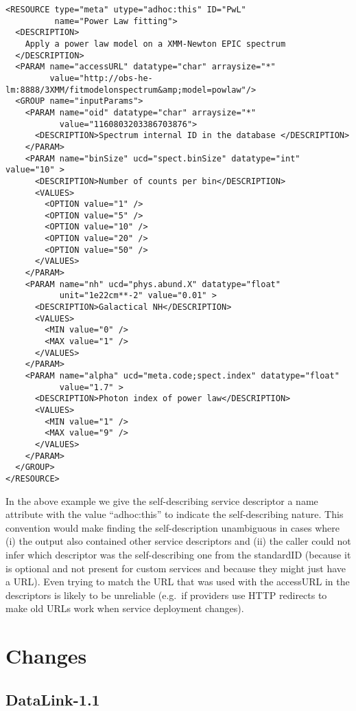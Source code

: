 \documentclass[11pt,a4paper]{ivoa}
\begin{document}
\begin{verbatim}
<RESOURCE type="meta" utype="adhoc:this" ID="PwL"
          name="Power Law fitting">
  <DESCRIPTION>
    Apply a power law model on a XMM-Newton EPIC spectrum
  </DESCRIPTION>
  <PARAM name="accessURL" datatype="char" arraysize="*"
         value="http://obs-he-lm:8888/3XMM/fitmodelonspectrum&amp;model=powlaw"/>
  <GROUP name="inputParams">
    <PARAM name="oid" datatype="char" arraysize="*"
           value="1160803203386703876">
      <DESCRIPTION>Spectrum internal ID in the database </DESCRIPTION>
    </PARAM>
    <PARAM name="binSize" ucd="spect.binSize" datatype="int" value="10" >
      <DESCRIPTION>Number of counts per bin</DESCRIPTION>
      <VALUES>
        <OPTION value="1" />
        <OPTION value="5" />
        <OPTION value="10" />
        <OPTION value="20" />
        <OPTION value="50" />
      </VALUES>
    </PARAM>
    <PARAM name="nh" ucd="phys.abund.X" datatype="float"
           unit="1e22cm**-2" value="0.01" >
      <DESCRIPTION>Galactical NH</DESCRIPTION>
      <VALUES>
        <MIN value="0" />
        <MAX value="1" />
      </VALUES>
    </PARAM>
    <PARAM name="alpha" ucd="meta.code;spect.index" datatype="float"
           value="1.7" >
      <DESCRIPTION>Photon index of power law</DESCRIPTION>
      <VALUES>
        <MIN value="1" />
        <MAX value="9" />
      </VALUES>
    </PARAM>
  </GROUP>
</RESOURCE>
\end{verbatim}

In the above example we give the self-describing service descriptor a
name attribute with the value ``adhoc:this'' to indicate the self-describing
nature. This convention would make finding the self-description
unambiguous in cases where (i) the output also contained other service
descriptors and (ii) the caller could not infer which descriptor was
the self-describing one from the standardID (because it is optional
and not present for custom services and because they might just have a
URL). Even trying to match the URL that was used with the accessURL in
the descriptors is likely to be unreliable (e.g.\ if providers use HTTP
redirects to make old URLs work when service deployment changes).


\section{Changes}

\subsection{DataLink-1.1}
\end{document}
